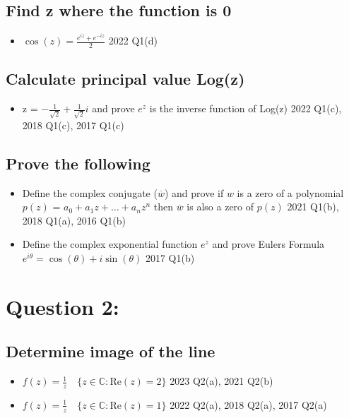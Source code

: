 \documentclass[a4paper, 8pt]{extarticle}
\begin{document}
\subsection{Find z where the function is 0}
\begin{itemize}
    \item $\cos(z) = \frac{e^{iz} + e^{-iz}}{2}$ \hfill 2022 Q1(d)
\end{itemize}
\subsection{Calculate principal value Log(z)}
\begin{itemize}
    \item z = $-\frac{1}{\sqrt{2}} + \frac{1}{\sqrt{2}} i$ and prove $e^z$ is the inverse function of Log(z) \hfill 2022 Q1(c), 2018 Q1(c), 2017 Q1(c)
\end{itemize}
\subsection{Prove the following}
\begin{itemize}
    \item Define the complex conjugate ($\overline{w}$) and prove if $w$ is a zero of a polynomial $p(z)$ = $a_0 + a_1 z + \ldots + a_n z^n$ then $\overline{w}$ is also a zero of $p(z)$ \hfill 2021 Q1(b), 2018 Q1(a), 2016 Q1(b)
    \item Define the complex exponential function $e^z$ and prove Eulers Formula $e^{i \theta} = \cos(\theta) + i \sin(\theta)$ \hfill 2017 Q1(b)
\end{itemize}





\pagebreak


\section{Question 2: }
\subsection{Determine image of the line}
\begin{itemize}
    \item $f(z) = \frac{1}{z} \quad \{z \in \mathbb{C}: \text{Re}(z) = 2\}$ \hfill 2023 Q2(a), 2021 Q2(b)
    \item $f(z) = \frac{1}{z} \quad \{z \in \mathbb{C}: \text{Re}(z) = 1\}$ \hfill 2022 Q2(a), 2018 Q2(a), 2017 Q2(a)
\end{itemize}
\end{document}
